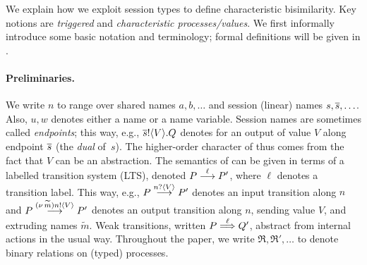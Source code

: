 

We explain how we exploit session types to 
define characteristic bisimilarity.
Key notions are \emph{triggered} and \emph{characteristic processes/values}.
We first informally introduce some basic notation and terminology; formal definitions will be given in .


\paragraph{Preliminaries.}
We write $n$ to range over shared names $a,b,\ldots$ and session (linear) names $s, \overline{s}, \ldots$.
Also, $u, w$ denotes either a name or a name variable.
Session names are sometimes called \emph{endpoints}; this way, e.g., 
$\overline{s} ! \langle V \rangle . Q$ denotes 
for an output of value $V$ along endpoint $\overline{s}$ (the \emph{dual} of~$s$).
The higher-order character of \HOp thus comes from the fact that $V$ can be an abstraction.
The semantics of \HOp can be given in terms of a labelled transition system (LTS),
denoted $P \stackrel{\ell}{\longrightarrow} P'$, where $\ell$ denotes a transition label.
This way, e.g., 
$P \stackrel{n ? \langle V \rangle}{\longrightarrow} P'$ denotes an input transition along $n$
and
$P \stackrel{(\nu\, \widetilde{m}) n ! \langle V \rangle}{\longrightarrow} P'$
denotes an output transition along $n$, 
sending value $V$, and extruding names $\widetilde{m}$. 
Weak transitions, written 
$P \stackrel{\ell}{\Longrightarrow} Q'$, abstract from internal actions in the usual way.
Throughout the paper, we write $\Re, \Re',\ldots$ to denote binary relations on (typed) processes.

